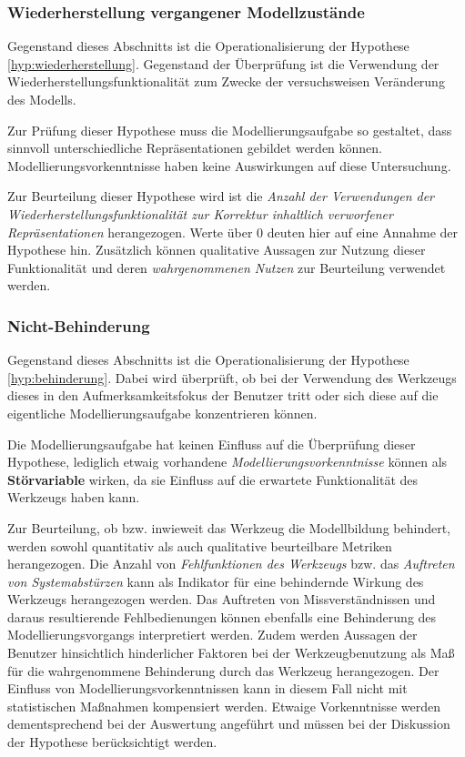 
\subsubsection{Wiederherstellung vergangener Modellzustände} %
\label{ssub:wiederherstellung_vergangener_modellzustände}

Gegenstand dieses Abschnitts ist die Operationalisierung der Hypothese \ref{hyp:wiederherstellung}. Gegenstand der Überprüfung ist die Verwendung der Wiederherstellungsfunktionalität zum Zwecke der versuchsweisen Veränderung des Modells.

Zur Prüfung dieser Hypothese muss die Modellierungsaufgabe so gestaltet, dass sinnvoll unterschiedliche Repräsentationen gebildet werden können. Modellierungsvorkenntnisse haben keine Auswirkungen auf diese Untersuchung.

Zur Beurteilung dieser Hypothese wird ist die \emph{Anzahl der Verwendungen der Wiederherstellungsfunktionalität zur Korrektur inhaltlich verworfener Repräsentationen} herangezogen. Werte über 0 deuten hier auf eine Annahme der Hypothese hin. Zusätzlich können qualitative Aussagen zur Nutzung dieser Funktionalität und deren \emph{wahrgenommenen Nutzen} zur Beurteilung verwendet werden. 


\subsubsection{Nicht-Behinderung} %
\label{ssub:nicht_behinderung}

Gegenstand dieses Abschnitts ist die Operationalisierung der Hypothese \ref{hyp:behinderung}. Dabei wird überprüft, ob bei der Verwendung des Werkzeugs dieses in den Aufmerksamkeitsfokus der Benutzer tritt oder sich diese auf die eigentliche Modellierungsaufgabe konzentrieren können. 

Die Modellierungsaufgabe hat keinen Einfluss auf die Überprüfung dieser Hypothese, lediglich etwaig vorhandene \emph{Modellierungsvorkenntnisse} können als \textbf{Störvariable} wirken, da sie Einfluss auf die erwartete Funktionalität des Werkzeugs haben kann.

Zur Beurteilung, ob bzw. inwieweit das Werkzeug die Modellbildung behindert, werden sowohl quantitativ als auch qualitative beurteilbare Metriken herangezogen. Die Anzahl von \emph{Fehlfunktionen des Werkzeugs} bzw. das \emph{Auftreten von Systemabstürzen} kann als Indikator für eine behindernde Wirkung des Werkzeugs herangezogen werden. Das Auftreten von Missverständnissen und daraus resultierende Fehlbedienungen können ebenfalls eine Behinderung des Modellierungsvorgangs interpretiert werden. Zudem werden Aussagen der Benutzer hinsichtlich hinderlicher Faktoren bei der Werkzeugbenutzung als Maß für die wahrgenommene Behinderung durch das Werkzeug herangezogen. Der Einfluss von Modellierungsvorkenntnissen kann in diesem Fall nicht mit statistischen Maßnahmen kompensiert werden. Etwaige Vorkenntnisse werden dementsprechend bei der Auswertung angeführt und müssen bei der Diskussion der Hypothese berücksichtigt werden.

